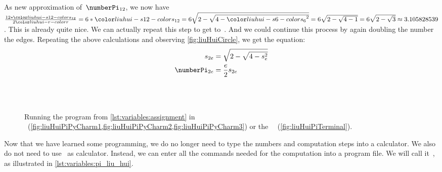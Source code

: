 As new approximation of~$\numberPi_{12}$, we now have $\frac{12*\liuhuist}{2\liuhuir}=6*\liuhuist=6\sqrt{2-\sqrt{4-\liuhuiss^2}}=6\sqrt{2-\sqrt{4-1}}=6\sqrt{2-\sqrt{3}}\approx 3.105828539$.
This is already quite nice.
We can actually repeat this step to get to~\liuhuistf.
And we could continue this process by again doubling the number the edges.
Repeating the above calculations and observing \cref{fig:liuHuiCircle}, we get the equation:%
%
\begin{align}%
s_{2e} &= \sqrt{2-\sqrt{4-s_e^2}}\label{eq:liuhui:sidelength}\\%
\numberPi_{2e} &= \frac{e}{2} s_{2e}\label{eq:liuhui:approx}%
\end{align}%
%
%
%
%
\begin{figure}[tb]%
\centering%
%
%
\hfill%
%
%
\\%
%
%
\\%
%
%
%
\caption{Running the program  from \cref{lst:variables:assignment} in \pycharm~(\cref{fig:liuHuiPiPyCharm1,fig:liuHuiPiPyCharm2,fig:liuHuiPiPyCharm3}) or the \ubuntu\ ~(\cref{fig:liuHuiPiTerminal}).}%
\label{fig:variables:liuHuiPi}%
\end{figure}%
%
Now that we have learned some programming, we do no longer need to type the numbers and computation steps into a calculator.
We also do not need to use \python\ as calculator.
Instead, we can enter all the commands needed for the computation into a program file.
We will call it~, as illustrated in \cref{lst:variables:pi_liu_hui}.

